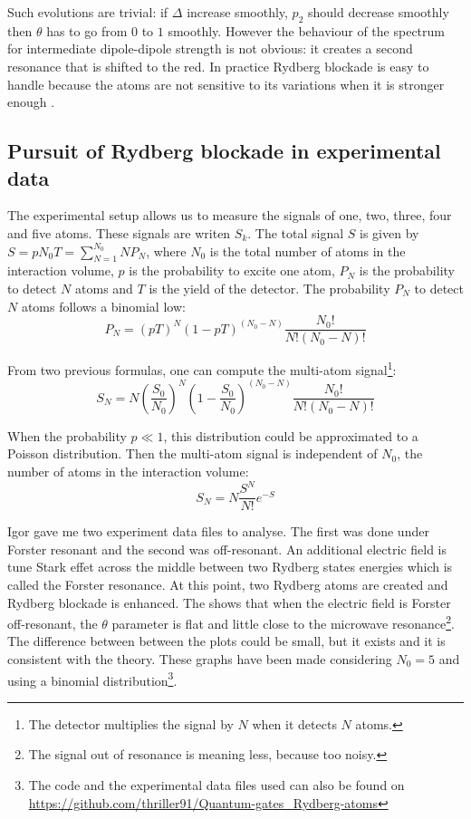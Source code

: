 \documentclass[twoside, open=right
]{scrreprt}
\begin{document}
\par Such evolutions are trivial: if $\Delta$ increase smoothly, $p_2$ should decrease smoothly then $\theta$ has to go from $0$ to $1$ smoothly. However the behaviour of the spectrum for intermediate dipole-dipole strength is not obvious: it creates a second resonance that is shifted to the red. In practice Rydberg blockade is easy to handle because the atoms are not sensitive to its variations when it is stronger enough \cite{Saff-rev}.

\subsection{Pursuit of Rydberg blockade in experimental data}

\par The experimental setup allows us to measure the signals of one, two, three, four and five atoms. These signals are writen $S_k$. The total signal $S$ is given by $S = p N_0 T = \sum_{N=1}^{N_0} N P_N$, where $N_0$ is the total number of atoms in the interaction volume, $p$ is the probability to excite one atom, $P_N$ is the probability to detect $N$ atoms and $T$ is the yield of the detector. The probability $P_N$ to detect $N$ atoms follows a binomial low: \[ P_N = (pT)^N (1-pT)^{(N_0-N)} \frac{N_0!}{N! (N_0-N)!} \]

\par From two previous formulas, one can compute the multi-atom signal\footnote{The detector multiplies the signal by $N$ when it detects $N$ atoms.}: \[ S_N = N \left(\frac{S_0}{N_0}\right)^N \left(1-\frac{S_0}{N_0}\right)^{(N_0-N)} \frac{N_0!}{N! (N_0-N)!} \]

\par When the probability $p \ll 1$, this distribution could be approximated to a Poisson distribution. Then the multi-atom signal is independent of $N_0$, the number of atoms in the interaction volume: \[ S_N = N \frac{S^N}{N!} e^{-S} \]

\par Igor gave me two experiment data files to analyse. The first was done under Forster resonant and the second was off-resonant. An additional electric field is tune Stark effet across the middle between two Rydberg states energies which is called the Forster resonance. At this point, two Rydberg atoms are created and Rydberg blockade is enhanced. The  shows that when the electric field is Forster off-resonant, the $\theta$ parameter is flat and little close to the microwave resonance\footnote{The signal out of resonance is meaning less, because too noisy.}. The difference between between the plots could be small, but it exists and it is consistent with the theory. These graphs have been made considering $N_0 = 5$ and using a binomial distribution\footnote{The code and the experimental data files used can also be found on \url{https://github.com/thriller91/Quantum-gates_Rydberg-atoms}}.
\end{document}
